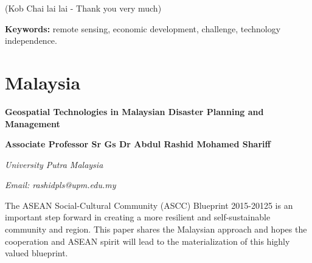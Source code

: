 \begin{center}
{(Kob Chai lai lai - Thank you very much) \par}
\vspace{0.5 cm}
\textbf{Keywords:} remote sensing, economic development, challenge, technology independence.
\end{center}

\section{Malaysia}

\vspace{0.5 cm}

{
	\begin{center}
	{\large \bfseries Geospatial Technologies in Malaysian Disaster Planning and Management\par}
	\vspace{0.5 cm}
	{\bfseries Associate Professor Sr Gs Dr Abdul Rashid Mohamed Shariff\par}
	{\itshape University Putra Malaysia\par}
	{\itshape Email: rashidpls@upm.edu.my\par}
	\end{center}
	{\tab The ASEAN Social-Cultural Community (ASCC) Blueprint 2015-20125 is an important step forward in creating a more resilient and self-sustainable community and region. This paper shares the Malaysian approach and hopes the cooperation and ASEAN spirit will lead to the materialization of this highly valued blueprint.
	
\vspace{0.4 cm}

}}

